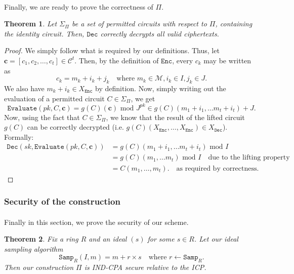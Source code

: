 \documentclass{article}
\newtheorem{theorem}{Theorem}[section]
\theoremstyle{definition}
\theoremstyle{example}
\newcommand{\Enc}{\texttt{Enc}}
\newcommand{\Dec}{\texttt{Dec}}
\newcommand{\Evaluate}{\texttt{Evaluate}}
\newcommand{\M}{\mathcal{M}}
\renewcommand{\C}{\mathcal{C}}
\renewcommand{\mod}{\,\,\text{mod}\,\,}
\newcommand{\Samp}{\texttt{Samp}}
\renewcommand{\vec}[1]{\mathbf{#1}}
\begin{document}
\paragraph{} Finally, we are ready to prove the correctness of $\Pi$.
\begin{theorem}
  Let $\Sigma_\Pi$ be a set of permitted circuits with respect to $\Pi$,
  containing the identity circuit. Then, $\Dec$ correctly decrypts all valid ciphertexts.
\end{theorem}
\begin{proof}
  We simply follow what is required by our definitions.
  Thus, let $\vec{c} = [c_1, c_2, \hdots, c_t] \in \C^t$. Then, by the
  definition of $\Enc$, every $c_k$ may be written as
  \[
    c_k = m_k + i_k + j_k\quad\text{where }m_k \in \M, i_k \in I, j_k \in J.
  \]
  We also have $m_k + i_k \in X_\Enc$ by definition. Now, simply writing out the
  evaluation of a permitted circuit $C \in \Sigma_\Pi$, we get
  \[
    \Evaluate(pk, C, \vec{c}) = g(C)(\vec{c}) \mod J^{pk} \in g(C)(m_1 + i_1,
    \hdots m_t + i_t) + J.
  \]
  Now, using the fact that $C \in \Sigma_\Pi$, we know that the result of the lifted circuit
  $g(C)$ can be correctly decrypted (i.e. $g(C)(X_\Enc, \hdots, X_\Enc) \in X_\Dec$). Formally:
  \begin{align*}
    \Dec(sk, \Evaluate(pk, C, \vec{c})) &= g(C)(m_1 + i_1,
                                          \hdots m_t + i_t) \mod I \\
                                        &= g(C)(m_1, \hdots m_t) \mod I\quad\text{due to the lifting property} \\
                                        &= C(m_1, \hdots, m_t).\quad \text{as required by correctness.}
  \end{align*}
\end{proof}
\subsubsection{Security of the construction}
\paragraph{} Finally in this section, we prove the security of our scheme.
\begin{theorem}
Fix a ring $R$ and an ideal $(s)$ for some $s \in R$. Let our ideal sampling algorithm
\[
  \Samp_R(I, m) = m + r \times s\quad\text{where } r \leftarrow \Samp_R.
\]
Then our construction $\Pi$ is IND-CPA secure relative to the ICP.
\end{theorem}
\end{document}
